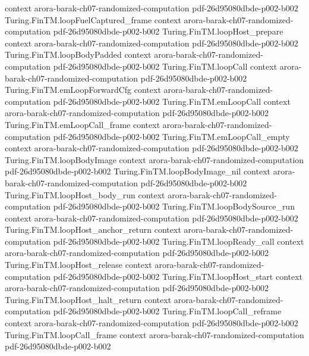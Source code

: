 \begin{theorem}
  {context}
  {arora-barak-ch07-randomized-computation}
  {pdf-26d95080dbde-p002-b002}
\proofstep
  {Turing.FinTM.loopFuelCaptured_frame}
  {context}
  {arora-barak-ch07-randomized-computation}
  {pdf-26d95080dbde-p002-b002}
\proofstep
  {Turing.FinTM.loopHost_prepare}
  {context}
  {arora-barak-ch07-randomized-computation}
  {pdf-26d95080dbde-p002-b002}
\proofstep
  {Turing.FinTM.loopBodyPadded}
  {context}
  {arora-barak-ch07-randomized-computation}
  {pdf-26d95080dbde-p002-b002}
\proofstep
  {Turing.FinTM.loopCall}
  {context}
  {arora-barak-ch07-randomized-computation}
  {pdf-26d95080dbde-p002-b002}
\proofstep
  {Turing.FinTM.emLoopForwardCfg}
  {context}
  {arora-barak-ch07-randomized-computation}
  {pdf-26d95080dbde-p002-b002}
\proofstep
  {Turing.FinTM.emLoopCall}
  {context}
  {arora-barak-ch07-randomized-computation}
  {pdf-26d95080dbde-p002-b002}
\proofstep
  {Turing.FinTM.emLoopCall_frame}
  {context}
  {arora-barak-ch07-randomized-computation}
  {pdf-26d95080dbde-p002-b002}
\proofstep
  {Turing.FinTM.emLoopCall_empty}
  {context}
  {arora-barak-ch07-randomized-computation}
  {pdf-26d95080dbde-p002-b002}
\proofstep
  {Turing.FinTM.loopBodyImage}
  {context}
  {arora-barak-ch07-randomized-computation}
  {pdf-26d95080dbde-p002-b002}
\proofstep
  {Turing.FinTM.loopBodyImage_nil}
  {context}
  {arora-barak-ch07-randomized-computation}
  {pdf-26d95080dbde-p002-b002}
\proofstep
  {Turing.FinTM.loopHost_body_run}
  {context}
  {arora-barak-ch07-randomized-computation}
  {pdf-26d95080dbde-p002-b002}
\proofstep
  {Turing.FinTM.loopBodySource_run}
  {context}
  {arora-barak-ch07-randomized-computation}
  {pdf-26d95080dbde-p002-b002}
\proofstep
  {Turing.FinTM.loopHost_anchor_return}
  {context}
  {arora-barak-ch07-randomized-computation}
  {pdf-26d95080dbde-p002-b002}
\proofstep
  {Turing.FinTM.loopReady_call}
  {context}
  {arora-barak-ch07-randomized-computation}
  {pdf-26d95080dbde-p002-b002}
\proofstep
  {Turing.FinTM.loopHost_release}
  {context}
  {arora-barak-ch07-randomized-computation}
  {pdf-26d95080dbde-p002-b002}
\proofstep
  {Turing.FinTM.loopHost_start}
  {context}
  {arora-barak-ch07-randomized-computation}
  {pdf-26d95080dbde-p002-b002}
\proofstep
  {Turing.FinTM.loopHost_halt_return}
  {context}
  {arora-barak-ch07-randomized-computation}
  {pdf-26d95080dbde-p002-b002}
\proofstep
  {Turing.FinTM.loopCall_reframe}
  {context}
  {arora-barak-ch07-randomized-computation}
  {pdf-26d95080dbde-p002-b002}
\proofstep
  {Turing.FinTM.loopCall_frame}
  {context}
  {arora-barak-ch07-randomized-computation}
  {pdf-26d95080dbde-p002-b002}
\proofstep

\end{theorem}
